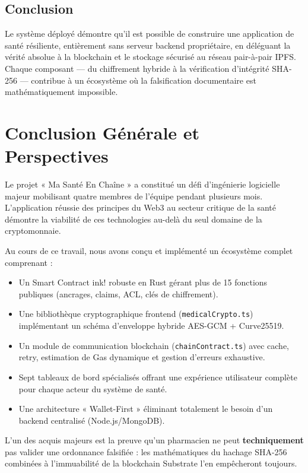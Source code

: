 \documentclass[12pt,a4paper]{report}
\begin{document}
\section{Conclusion}
Le système déployé démontre qu'il est possible de construire une application de santé résiliente, entièrement sans serveur backend propriétaire, en déléguant la vérité absolue à la blockchain et le stockage sécurisé au réseau pair-à-pair IPFS. Chaque composant — du chiffrement hybride à la vérification d'intégrité SHA-256 — contribue à un écosystème où la falsification documentaire est mathématiquement impossible.

\chapter*{Conclusion Générale et Perspectives}

Le projet « Ma Santé En Chaîne » a constitué un défi d'ingénierie logicielle majeur mobilisant quatre membres de l'équipe pendant plusieurs mois. L'application réussie des principes du Web3 au secteur critique de la santé démontre la viabilité de ces technologies au-delà du seul domaine de la cryptomonnaie.

Au cours de ce travail, nous avons conçu et implémenté un écosystème complet comprenant :
\begin{itemize}
    \item Un Smart Contract ink! robuste en Rust gérant plus de 15 fonctions publiques (ancrages, claims, ACL, clés de chiffrement).
    \item Une bibliothèque cryptographique frontend (\texttt{medicalCrypto.ts}) implémentant un schéma d'enveloppe hybride AES-GCM + Curve25519.
    \item Un module de communication blockchain (\texttt{chainContract.ts}) avec cache, retry, estimation de Gas dynamique et gestion d'erreurs exhaustive.
    \item Sept tableaux de bord spécialisés offrant une expérience utilisateur complète pour chaque acteur du système de santé.
    \item Une architecture « Wallet-First » éliminant totalement le besoin d'un backend centralisé (Node.js/MongoDB).
\end{itemize}

L'un des acquis majeurs est la preuve qu'un pharmacien ne peut \textbf{techniquement} pas valider une ordonnance falsifiée : les mathématiques du hachage SHA-256 combinées à l'immuabilité de la blockchain Substrate l'en empêcheront toujours.
\end{document}
